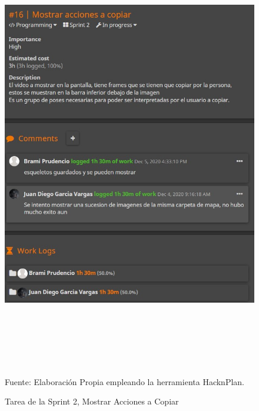 \begin{figure}[t!]
	\centering
	\includegraphics[width=15cm,height=19cm,]{./Images/tareaexample.jpg}
	\caption{Tarea de la Sprint 2, Mostrar Acciones a Copiar}
	\footnotesize Fuente: Elaboración Propia empleando la herramienta HacknPlan.
	\label{sprinttarea}
\end{figure}




